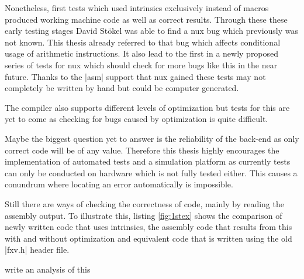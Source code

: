 Nonetheless, first tests which used intrinsics exclusively instead of macros produced working machine code as well as correct results.
Through these these early testing stages David Stökel was able to find a nux bug which previously was not known.
This thesis already referred to that bug which affects conditional usage of arithmetic instructions.
It also lead to the first in a newly proposed series of tests for nux which should check for more bugs like this in the near future.
Thanks to the |asm| support that nux gained these tests may not completely be written by hand but could be computer generated.

The compiler also supports different levels of optimization but tests for this are yet to come as checking for bugs caused by optimization is quite difficult.

Maybe the biggest question yet to answer is the reliability of the back-end as only correct code will be of any value.
Therefore this thesis highly encourages the implementation of automated tests and a simulation platform as currently tests can only be conducted on hardware which is not fully tested either.
This causes a conundrum where locating an error automatically is impossible.

Still there are ways of checking the correctness of code, mainly by reading the assembly output.
To illustrate this, listing \ref{fig:1stex} shows the comparison of newly written code that uses intrinsics, the assembly code that results from this with and without optimization and equivalent code that is written using the old |fxv.h| header file.

write an analysis of this



